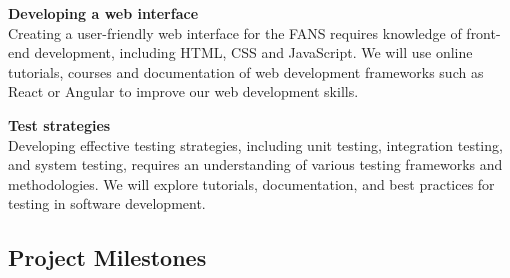 \textbf{Developing a web interface} \\
Creating a user-friendly web interface for the FANS requires knowledge of front-end development, including HTML, CSS
and JavaScript. We will use online tutorials, courses and documentation of web development frameworks such as React or
Angular to improve our web development skills.

\textbf{Test strategies} \\
Developing effective testing strategies, including unit testing, integration testing, and system
testing, requires an understanding of various testing frameworks and methodologies. We will explore tutorials,
documentation, and best practices for testing in software development.

\subsection{Project Milestones}

